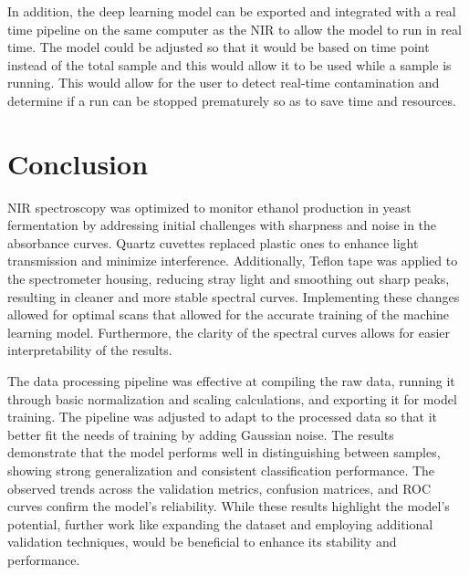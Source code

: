 \documentclass[12pt]{report}
\begin{document}
In addition, the deep learning model can be exported and integrated with a real time pipeline on the same computer as the NIR to allow the model to run in real time. The model could be adjusted so that it would be based on time point instead of the total sample and this would allow it to be used while a sample is running. This would allow for the user to detect real-time contamination and determine if a run can be stopped prematurely so as to save time and resources. 

\section{Conclusion}

NIR spectroscopy was optimized to monitor ethanol production in yeast fermentation by addressing initial challenges with sharpness and noise in the absorbance curves. Quartz cuvettes replaced plastic ones to enhance light transmission and minimize interference. Additionally, Teflon tape was applied to the spectrometer housing, reducing stray light and smoothing out sharp peaks, resulting in cleaner and more stable spectral curves. Implementing these changes allowed for optimal scans that allowed for the accurate training of the machine learning model. Furthermore, the clarity of the spectral curves allows for easier interpretability of the results.

The data processing pipeline was effective at compiling the raw data, running it through basic normalization and scaling calculations, and exporting it for model training. The  pipeline was adjusted to adapt to the processed data so that it better fit the needs of training by adding Gaussian noise. The results demonstrate that the model performs well in distinguishing between samples, showing strong generalization and consistent classification performance. The observed trends across the validation metrics, confusion matrices, and ROC curves confirm the model's reliability. While these results highlight the model's potential, further work like expanding the dataset and employing additional validation techniques, would be beneficial to enhance its stability and performance.

\end{document}
